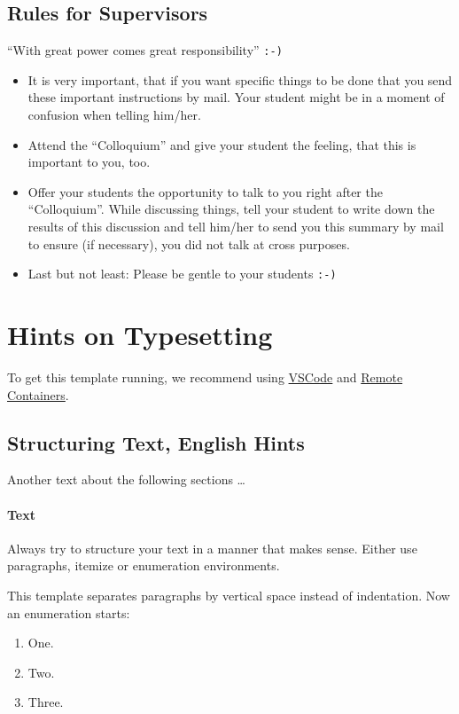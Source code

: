 \subsection{Rules for Supervisors}
\enquote{With great power comes great responsibility} \texttt{:-)}

\begin{itemize}
\item It is very important, that if you want specific things to be done that you send these important instructions by mail. Your student might be in a moment of confusion when telling him/her.
\item Attend the \enquote{Colloquium} and give your student the feeling, that this is important to you, too.
\item Offer your students the opportunity to talk to you right after the \enquote{Colloquium}. While discussing things, tell your student to write down the results of this discussion and tell him/her to send you this summary by mail to ensure (if necessary), you did not talk at cross purposes.
\item Last but not least: Please be gentle to your students \texttt{:-)}
\end{itemize}

\section{Hints on Typesetting}
To get this template running, we recommend using \href{https://code.visualstudio.com/download}{VSCode} and \href{https://code.visualstudio.com/docs/devcontainers/tutorial}{Remote Containers}.

\subsection{Structuring Text, English Hints}
Another text about the following sections \dots

\paragraph{Text}
Always try to structure your text in a manner that makes sense. Either use paragraphs, itemize or enumeration environments.

This template separates paragraphs by vertical space instead of indentation. Now an enumeration starts:

\begin{enumerate}
\item One.
\item Two.
\item Three.
\end{enumerate}


